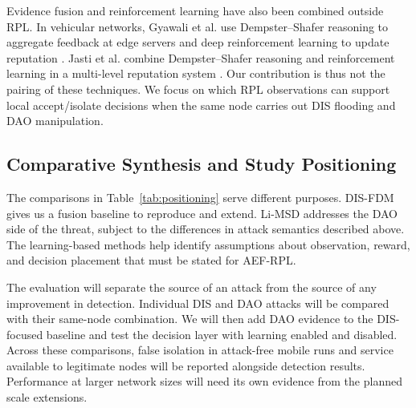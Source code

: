 \documentclass[journal]{IEEEtran}
\begin{document}
Evidence fusion and reinforcement learning have also been combined outside RPL. In vehicular networks, Gyawali et al. use Dempster--Shafer reasoning to aggregate feedback at edge servers and deep reinforcement learning to update reputation \cite{gyawali2021}. Jasti et al. combine Dempster--Shafer reasoning and reinforcement learning in a multi-level reputation system \cite{jasti2024}. Our contribution is thus not the pairing of these techniques. We focus on which RPL observations can support local accept/isolate decisions when the same node carries out DIS flooding and DAO manipulation.

\subsection{Comparative Synthesis and Study Positioning}
The comparisons in Table~\ref{tab:positioning} serve different purposes. DIS-FDM gives us a fusion baseline to reproduce and extend. Li-MSD addresses the DAO side of the threat, subject to the differences in attack semantics described above. The learning-based methods help identify assumptions about observation, reward, and decision placement that must be stated for AEF-RPL.

The evaluation will separate the source of an attack from the source of any improvement in detection. Individual DIS and DAO attacks will be compared with their same-node combination. We will then add DAO evidence to the DIS-focused baseline and test the decision layer with learning enabled and disabled. Across these comparisons, false isolation in attack-free mobile runs and service available to legitimate nodes will be reported alongside detection results. Performance at larger network sizes will need its own evidence from the planned scale extensions.
\end{document}
